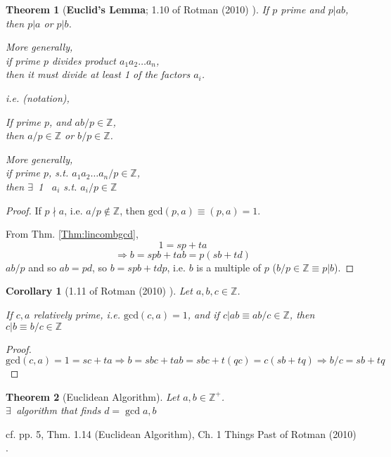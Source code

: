\documentclass[10pt]{amsart}
\newtheorem{theorem}{Theorem}
\newtheorem{corollary}{Corollary}
\begin{document}
\begin{multicols*}{2}
\begin{theorem}[\textbf{Euclid's Lemma}; 1.10 of Rotman (2010) \cite{JRotman2010}]
If $p$ prime and $p|ab$, then $p|a$ or $p|b$.  

More generally,  \\
if prime $p$ divides product $a_1a_2\dots a_n$, \\
then it must divide at least 1 of the factors $a_i$.  

i.e. (notation),  

If prime $p$, and $ab/p \in \mathbb{Z}$, \\
then $a/p\in \mathbb{Z}$ or $b/p \in \mathbb{Z}$.  

More generally, \\
if prime $p$, s.t. $a_1a_2 \dots a_n/p \in \mathbb{Z}$, \\
then $\exists \, $ 1 \, $a_i$ s.t. $a_i/p \in \mathbb{Z}$
\end{theorem}
\begin{proof}
If $p\nmid a$, i.e. $a/p \notin \mathbb{Z}$, then $\text{gcd}(p,a)  \equiv (p,a) =1$.  

From Thm. \ref{Thm:lincombgcd}, 
\[
1 = sp+ta
\]
\[
\Longrightarrow b = spb + tab = p(sb+td)
\]
$ab/p$ and so $ab=pd$, so $b=spb+tdp$, i.e. $b$ is a multiple of $p$ ($b/p \in \mathbb{Z} \equiv p | b$).  




\end{proof}

\begin{corollary}[1.11 of Rotman (2010) \cite{JRotman2010}]\label{Cor:relprimefactors}
Let $a,b,c \in \mathbb{Z}$.  

If $c,a$ relatively prime, i.e. $\text{gcd}(c,a)=1$, and if $c|ab \equiv ab/c\in \mathbb{Z}$,
then $c|b \equiv b/c \in \mathbb{Z}$
\end{corollary}
\begin{proof}
\[
\text{gcd}(c,a)=1 = sc+ta \Longrightarrow b=sbc + tab = sbc + t(qc) = c(sb+tq) \Longrightarrow b/c = sb+tq 
\]
\end{proof}

\begin{theorem}[Euclidean Algorithm]
	Let $a,b \in \mathbb{Z}^+$.  \\
	$\exists \, $ algorithm that finds $d= \gcd{a,b}$
\end{theorem}

cf. pp. 5, Thm. 1.14 (Euclidean Algorithm), Ch. 1 Things Past of Rotman (2010) \cite{JRotman2010}.  


\end{multicols*}
\end{document}
